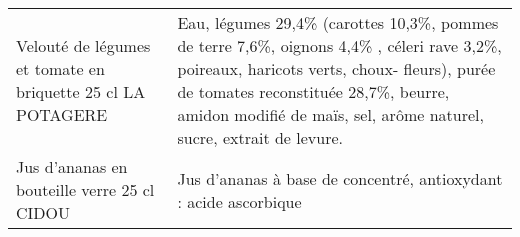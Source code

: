 \begin{longtable}{p{5cm}p{10cm}}
                                              Velouté de légumes et tomate en briquette 25 cl LA POTAGERE &                                                                                                                                                                                                                                                                                                                                                                                                                                                                                                                                                                                                                                                                                                                                                                                  Eau, légumes 29,4\% (carottes 10,3\%, pommes de terre 7,6\%, oignons 4,4\% , céleri rave 3,2\%, poireaux, haricots verts, choux- fleurs), purée de tomates reconstituée 28,7\%, beurre, amidon modifié de maïs, sel, arôme naturel, sucre, extrait de levure. \\
                                                              Jus d'ananas en bouteille verre 25 cl CIDOU &                                                                                                                                                                                                                                                                                                                                                                                                                                                                                                                                                                                                                                                                                                                                                                                                                                                                                                                                                                         Jus d'ananas à base de concentré, antioxydant : acide ascorbique \\

\end{longtable}
